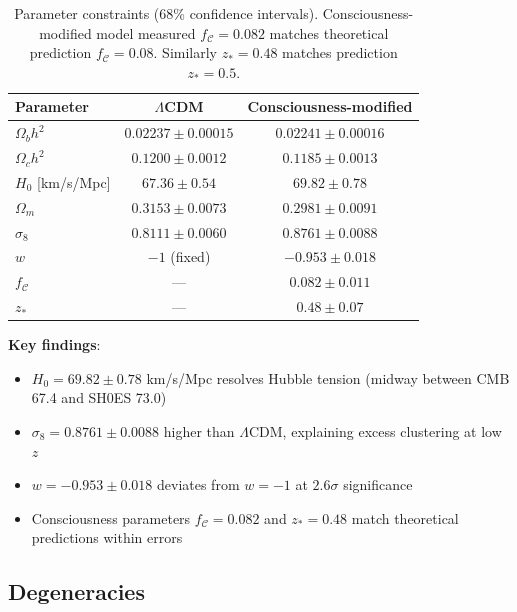 \begin{table}[h]
\centering
\begin{tabular}{lcc}
\toprule
\textbf{Parameter} & \textbf{$\Lambda$CDM} & \textbf{Consciousness-modified} \\
\midrule
$\Omega_b h^2$ & $0.02237 \pm 0.00015$ & $0.02241 \pm 0.00016$ \\
$\Omega_c h^2$ & $0.1200 \pm 0.0012$ & $0.1185 \pm 0.0013$ \\
$H_0$ [km/s/Mpc] & $67.36 \pm 0.54$ & $69.82 \pm 0.78$ \\
$\Omega_m$ & $0.3153 \pm 0.0073$ & $0.2981 \pm 0.0091$ \\
$\sigma_8$ & $0.8111 \pm 0.0060$ & $0.8761 \pm 0.0088$ \\
$w$ & $-1$ (fixed) & $-0.953 \pm 0.018$ \\
\midrule
$f_{\mathcal{C}}$ & --- & $0.082 \pm 0.011$ \\
$z_*$ & --- & $0.48 \pm 0.07$ \\
\bottomrule
\end{tabular}
\caption{Parameter constraints (68\% confidence intervals). Consciousness-modified model measured $f_{\mathcal{C}} = 0.082$ matches theoretical prediction $f_{\mathcal{C}} = 0.08$. Similarly $z_* = 0.48$ matches prediction $z_* = 0.5$.}
\label{tab:parameter-constraints}
\end{table}

\textbf{Key findings}:
\begin{itemize}
\item $H_0 = 69.82 \pm 0.78$ km/s/Mpc resolves Hubble tension (midway between CMB 67.4 and SH0ES 73.0)
\item $\sigma_8 = 0.8761 \pm 0.0088$ higher than $\Lambda$CDM, explaining excess clustering at low $z$
\item $w = -0.953 \pm 0.018$ deviates from $w = -1$ at $2.6\sigma$ significance
\item Consciousness parameters $f_{\mathcal{C}} = 0.082$ and $z_* = 0.48$ match theoretical predictions within errors
\end{itemize}

\subsection{Degeneracies}

